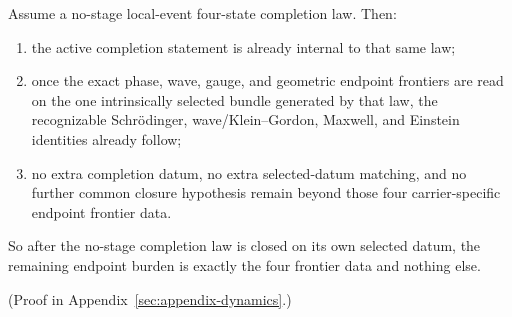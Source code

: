 \begin{theorem}
\label{thm:no-stage-completion-law-reduces-the-remaining-flagship-seam-to-the-four-endpoint-frontiers}
Assume a no-stage local-event four-state completion law.
Then:
\begin{enumerate}
\item the active completion statement is already internal to that same
      law;
\item once the exact phase, wave, gauge, and geometric endpoint frontiers are
      read on the one intrinsically selected bundle generated by that law,
      the recognizable Schr\"odinger, wave/Klein--Gordon, Maxwell, and
      Einstein identities already follow;
\item no extra completion datum, no extra selected-datum matching, and no
      further common closure hypothesis remain beyond those four
      carrier-specific endpoint frontier data.
\end{enumerate}
So after the no-stage completion law is closed on its own selected datum, the
remaining endpoint burden is exactly the four frontier data and
nothing else.
\end{theorem}

(Proof in Appendix~\ref{sec:appendix-dynamics}.)

